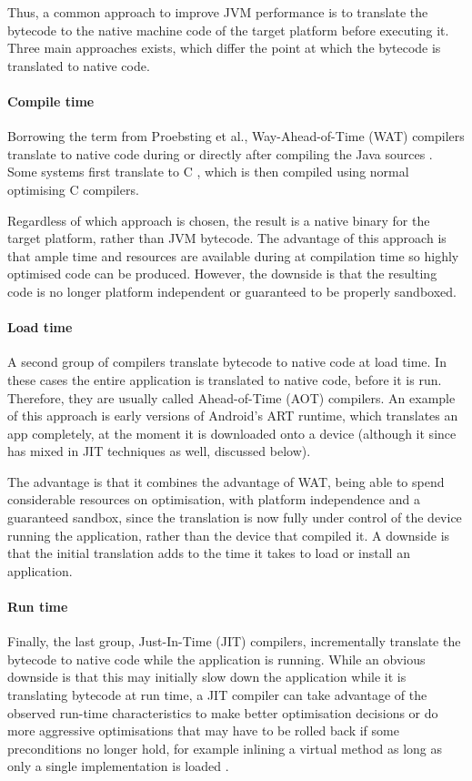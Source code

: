 Thus, a common approach to improve JVM performance is to translate the bytecode to the native machine code of the target platform before executing it. Three main approaches exists, which differ the point at which the bytecode is translated to native code.

\paragraph{Compile time}
Borrowing the term from Proebsting et al., Way-Ahead-of-Time (WAT) compilers translate to native code during or directly after compiling the Java sources \cite{Proebsting:1997wg}. Some systems first translate to C \cite{Dean:1996wb}, which is then compiled using normal optimising C compilers. 

Regardless of which approach is chosen, the result is a native binary for the target platform, rather than JVM bytecode. The advantage of this approach is that ample time and resources are available during at compilation time so highly optimised code can be produced. However, the downside is that the resulting code is no longer platform independent or guaranteed to be properly sandboxed.

\paragraph{Load time}
A second group of compilers translate bytecode to native code at load time. In these cases the entire application is translated to native code, before it is run. Therefore, they are usually called Ahead-of-Time (AOT) compilers. An example of this approach is early versions of Android's ART runtime, which translates an app completely, at the moment it is downloaded onto a device (although it since has mixed in JIT techniques as well, discussed below).

The advantage is that it combines the advantage of WAT, being able to spend considerable resources on optimisation, with platform independence and a guaranteed sandbox, since the translation is now fully under control of the device running the application, rather than the device that compiled it. A downside is that the initial translation adds to the time it takes to load or install an application.

\paragraph{Run time}
Finally, the last group, Just-In-Time (JIT) compilers, incrementally translate the bytecode to native code while the application is running. While an obvious downside is that this may initially slow down the application while it is translating bytecode at run time, a JIT compiler can take advantage of the observed run-time characteristics to make better optimisation decisions or do more aggressive optimisations that may have to be rolled back if some preconditions no longer hold, for example inlining a virtual method as long as only a single implementation is loaded \cite{Ishizaki:2000vv}.







